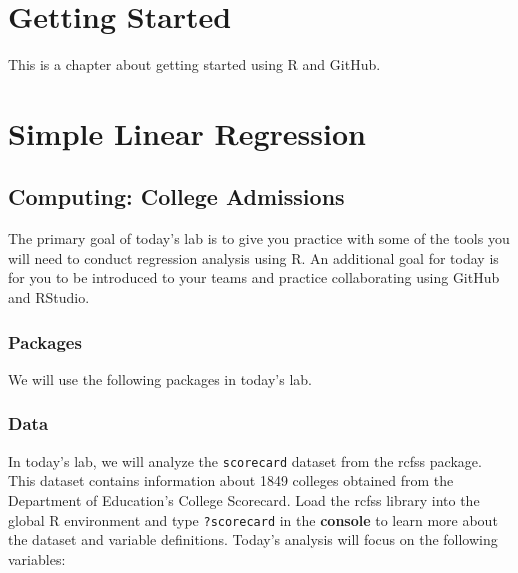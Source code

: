 \documentclass[]{book}
\begin{document}
\chapter{Getting Started}\label{getstarted}

This is a chapter about getting started using R and GitHub.

\chapter{Simple Linear Regression}\label{slr}

\section{Computing: College
Admissions}\label{computing-college-admissions}

The primary goal of today's lab is to give you practice with some of the
tools you will need to conduct regression analysis using R. An
additional goal for today is for you to be introduced to your teams and
practice collaborating using GitHub and RStudio.

\subsection{Packages}\label{packages}

We will use the following packages in today's lab.

\subsection{Data}\label{data}

In today's lab, we will analyze the \texttt{scorecard} dataset from the
rcfss package. This dataset contains information about 1849 colleges
obtained from the Department of Education's College Scorecard. Load the
rcfss library into the global R environment and type \texttt{?scorecard}
in the \textbf{console} to learn more about the dataset and variable
definitions. Today's analysis will focus on the following variables:
\end{document}
